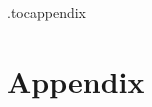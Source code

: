 \appendix
\setcounter{page}{1}
\etocdepthtag.toc{appendix} %
\section*{\Large Appendix}


\makeatletter
\newcommand{\appendix@noopaddcontentsline}[3]{}
\let\appendix@origsection\section
\renewcommand{\section}{\@ifstar\appendix@origsection\appendix@section}
\newcommand{\appendix@section}[1]{%
  \let\appendix@savedaddcontentsline\addcontentsline
  \let\addcontentsline\appendix@noopaddcontentsline
  \appendix@origsection{#1}%
  \let\addcontentsline\appendix@savedaddcontentsline
  \phantomsection
  \addcontentsline{toc}{section}{\protect\numberline{\thesection}#1}%
}
\let\appendix@origsubsection\subsection
\renewcommand{\subsection}{\@ifstar\appendix@origsubsection\appendix@subsection}
\newcommand{\appendix@subsection}[1]{%
  \let\appendix@savedaddcontentsline\addcontentsline
  \let\addcontentsline\appendix@noopaddcontentsline
  \appendix@origsubsection{#1}%
  \let\addcontentsline\appendix@savedaddcontentsline
  \phantomsection
  \addcontentsline{toc}{subsection}{\protect\numberline{\thesubsection}#1}%
}
\makeatother

\makeatletter
{%
\let\section\appendix@origsection
\let\subsection\appendix@origsubsection
\tableofcontents
}
\makeatother

